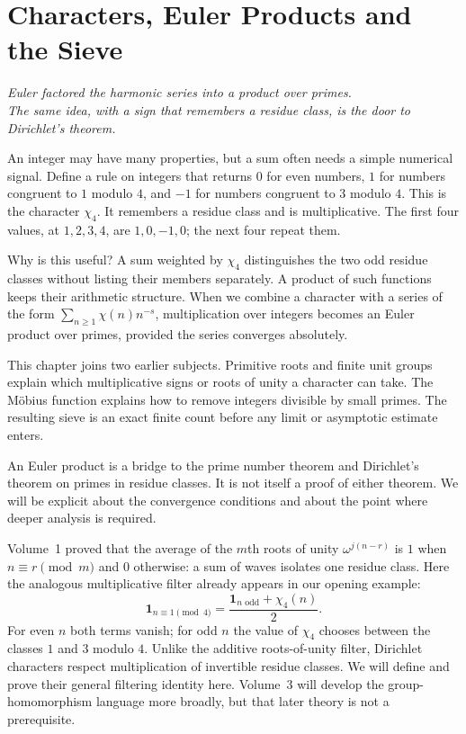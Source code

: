 \chapter{Characters, Euler Products and the Sieve}\label{ch:characters}

\begin{center}\itshape
Euler factored the harmonic series into a product over primes.\\
The same idea, with a sign that remembers a residue class, is the door to Dirichlet's theorem.
\end{center}


An integer may have many properties, but a sum often needs a simple numerical signal. Define a rule on integers that returns $0$ for even numbers, $1$ for numbers congruent to $1$ modulo $4$, and $-1$ for numbers congruent to $3$ modulo $4$. This is the character $\chi_4$. It remembers a residue class and is multiplicative. The first four values, at $1,2,3,4$, are $1,0,-1,0$; the next four repeat them.

Why is this useful? A sum weighted by $\chi_4$ distinguishes the two odd residue classes without listing their members separately. A product of such functions keeps their arithmetic structure. When we combine a character with a series of the form $\sum_{n\ge1}\chi(n)n^{-s}$, multiplication over integers becomes an Euler product over primes, provided the series converges absolutely.

This chapter joins two earlier subjects. Primitive roots and finite unit groups explain which multiplicative signs or roots of unity a character can take. The Möbius function explains how to remove integers divisible by small primes. The resulting sieve is an exact finite count before any limit or asymptotic estimate enters.

An Euler product is a bridge to the prime number theorem and Dirichlet's theorem on primes in residue classes. It is not itself a proof of either theorem. We will be explicit about the convergence conditions and about the point where deeper analysis is required.

\begin{reminder}
Volume~1 proved that the average of the $m$th roots of unity
$\omega^{j(n-r)}$ is $1$ when $n\equiv r\pmod m$ and $0$ otherwise:
a sum of waves isolates one residue class. Here the analogous
multiplicative filter already appears in our opening example:
\[
\mathbf 1_{n\equiv1\pmod4}
   =\frac{\mathbf 1_{n\text{ odd}}+\chi_4(n)}{2}.
\]
For even $n$ both terms vanish; for odd $n$ the value of $\chi_4$
chooses between the classes $1$ and $3$ modulo $4$.
Unlike the additive roots-of-unity filter, Dirichlet characters
respect multiplication of invertible residue classes.
We will define and prove their general filtering identity here.
Volume~3 will develop the group-homomorphism language more broadly,
but that later theory is not a prerequisite.
\end{reminder}



